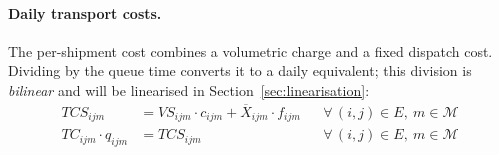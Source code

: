 
\paragraph{Daily transport costs.}
The per-shipment cost combines a volumetric charge and a fixed
dispatch cost. Dividing by the queue time converts it to a daily
equivalent; this division is \emph{bilinear} and will be
linearised in Section~\ref{sec:linearisation}:
%
\begin{align}
  TCS_{ijm}
  &= VS_{ijm}\cdot c_{ijm}
     + \overline{X}_{ijm}\cdot f_{ijm}
  && \forall\,(i,j)\in E,\ m\in\mathcal{M}
  \label{eq:cost-ship}\\[4pt]
  TC_{ijm}\cdot q_{ijm}
  &= TCS_{ijm}
  && \forall\,(i,j)\in E,\ m\in\mathcal{M}
  \label{eq:cost-daily}
\end{align}
